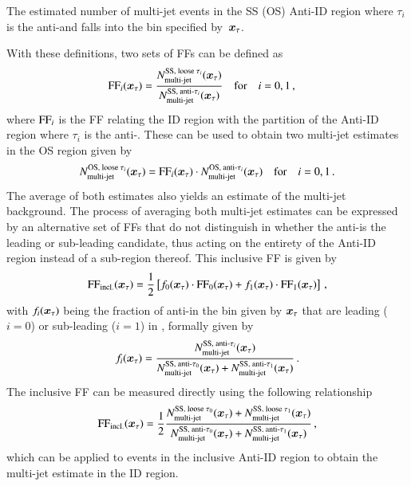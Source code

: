 {\begin{description}[style=standard]
  \item[$\NmjAntiID{SS(OS)}{i}\ffargs$] The estimated number of multi-jet events
    in the SS (OS) Anti-ID region where $\tau_i$ is the anti-\tauhadvis and
    falls into the bin specified by~$\bm{x}_\tau$.
  \end{description}
  With these definitions, two sets of FFs can be defined as
  \begin{align*}
    \text{FF}_{i}( \bm{x}_{\tau} ) &= \frac{N_\text{multi-jet}^{\text{SS, loose }\tau_{i}} ( \bm{x}_{\tau} )}{N_\text{multi-jet}^{\text{SS, anti-}\tau_{i}}( \bm{x}_{\tau} )}
                     \quad \text{for} \quad i = 0, 1 \,\text{,}
  \end{align*}
  where $\text{FF}_{i}$ is the FF relating the ID region with the partition of the
  Anti-ID region where $\tau_i$ is the anti-\tauhadvis. These can be used to
  obtain two multi-jet estimates in the OS region given by
  \begin{align*}
    N_\text{multi-jet}^{\text{OS, loose }\tau_{i}}( \bm{x}_{\tau} ) = \text{FF}_{i}( \bm{x}_{\tau} ) \cdot N_\text{multi-jet}^{\text{OS, anti-}\tau_{i}}( \bm{x}_{\tau} )
    \quad \text{for} \quad i = 0, 1 \,\text{.}
  \end{align*}
  The average of both estimates also yields an estimate of the multi-jet
  background. The process of averaging both multi-jet estimates can be expressed
  by an alternative set of FFs that do not distinguish in whether the
  anti-\tauhadvis is the leading or sub-leading \tauhadvis candidate, thus
  acting on the entirety of the Anti-ID region instead of a sub-region
  thereof. This inclusive FF is given by
  \begin{align*}
    \text{FF}_\text{incl.}( \bm{x}_{\tau} ) = \frac{1}{2} \left[ f_0( \bm{x}_{\tau} ) \cdot \text{FF}_0( \bm{x}_{\tau} )
    + f_1( \bm{x}_{\tau} ) \cdot \text{FF}_1( \bm{x}_{\tau} ) \right] \,\text{,}
  \end{align*}
  with $f_i( \bm{x}_{\tau} )$ being the fraction of anti-\tauhadvis in the bin given by
  $\bm{x}_\tau$ that are leading ($i = 0$) or sub-leading ($i = 1$) in \pT,
  formally given by
  \begin{align*}
    f_i( \bm{x}_{\tau} ) = \frac{N_\text{multi-jet}^{\text{SS, anti-}\tau_{i}}( \bm{x}_{\tau} )}
                      {N_\text{multi-jet}^{\text{SS, anti-}\tau_{0}}( \bm{x}_{\tau} ) + N_\text{multi-jet}^{\text{SS, anti-}\tau_{1}}( \bm{x}_{\tau} )} \,\text{.}
  \end{align*}
  The inclusive FF can be measured directly using the following relationship
  \begin{align}
    \text{FF}_\text{incl.}( \bm{x}_{\tau} )
    = \frac{1}{2} \frac{ N_\text{multi-jet}^{\text{SS, loose }\tau_{0}}( \bm{x}_{\tau} ) + N_\text{multi-jet}^{\text{SS, loose }\tau_{1}}( \bm{x}_{\tau} ) }
                       { N_\text{multi-jet}^{\text{SS, anti-}\tau_{0}}( \bm{x}_{\tau} ) + N_\text{multi-jet}^{\text{SS, anti-}\tau_{1}}( \bm{x}_{\tau} ) } \,\text{,}
    \label{eq:inclusive_fake_factor}
  \end{align}
  which can be applied to events in the inclusive Anti-ID region to obtain the
  multi-jet estimate in the ID region.

}
